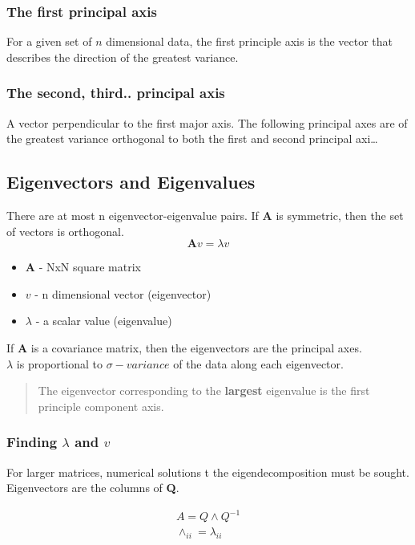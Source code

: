 \subsubsection{The first principal axis}
For a given set of $n$ dimensional data, the first principle axis  is the vector that describes the direction of the greatest variance.

\subsubsection{The second, third.. principal axis}
A vector perpendicular to the first major axis. The following principal axes are of the greatest variance orthogonal to both the first and second principal axi\dots

\subsection{Eigenvectors and Eigenvalues}
There are at most n eigenvector-eigenvalue pairs. If \textbf{A} is symmetric, then the set of vectors is orthogonal.
\begin{equation}
    \textbf{A}v = \lambda v
\end{equation}

\begin{itemize}
    \item \textbf{A} - NxN square matrix
    \item $v$ - n dimensional vector (eigenvector)
    \item $\lambda$ - a scalar value (eigenvalue)
\end{itemize}

If \textbf{A} is a covariance matrix, then the eigenvectors are the principal axes. 
\\
\noindent $\lambda$ is proportional to $\sigma - variance$ of the data along each eigenvector.

\begin{quote}
    The eigenvector corresponding to the \textbf{largest} eigenvalue is the first principle component axis.
\end{quote}

\subsubsection{Finding $\lambda$ and $v$}
For larger matrices, numerical solutions t the eigendecomposition must be sought. Eigenvectors are the columns of \textbf{Q}.

\begin{align}
    A = Q \land Q^{-1} \\
    \land_{ii} = \lambda_{ii}
\end{align}

